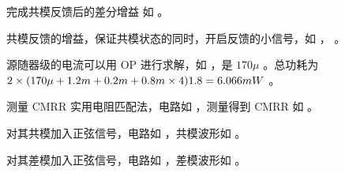 \documentclass[lang=cn,11pt,a4paper,cite=authoryear]{elegantpaper}
\begin{document}
{完成共模反馈后的差分增益} 如  。


共模反馈的增益，保证共模状态的同时，开启反馈的小信号，如  ， 。



源随器级的电流可以用 OP 进行求解，如  ，是 \(170 \mu\) 。总功耗为 \(2 \times (170 \mu + 1.2 m + 0.2 m \time 2 + 0.8m \times 4) 1.8 = 6.066 mW\) 。


测量 CMRR 实用电阻匹配法，电路如  ，测量得到 CMRR 如  。




对其共模加入正弦信号，电路如  ，共模波形如  。





对其差模加入正弦信号，电路如  ，差模波形如  。





% 








\end{document}
